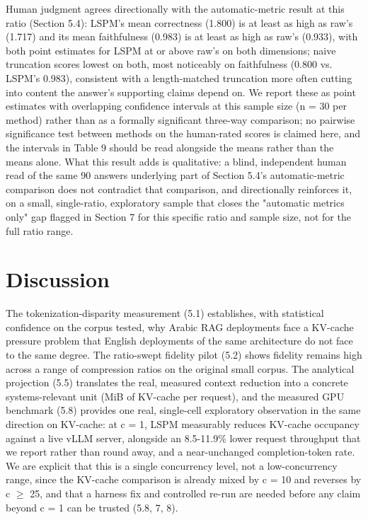 Human judgment agrees directionally with the automatic-metric result at this ratio (Section 5.4): LSPM's mean correctness (1.800) is at least as high as raw's (1.717) and its mean faithfulness (0.983) is at least as high as raw's (0.933), with both point estimates for LSPM at or above raw's on both dimensions; naive truncation scores lowest on both, most noticeably on faithfulness (0.800 vs. LSPM's 0.983), consistent with a length-matched truncation more often cutting into content the answer's supporting claims depend on. We report these as point estimates with overlapping confidence intervals at this sample size (n = 30 per method) rather than as a formally significant three-way comparison; no pairwise significance test between methods on the human-rated scores is claimed here, and the intervals in Table 9 should be read alongside the means rather than the means alone. What this result adds is qualitative: a blind, independent human read of the same 90 answers underlying part of Section 5.4's automatic-metric comparison does not contradict that comparison, and directionally reinforces it, on a small, single-ratio, exploratory sample that closes the "automatic metrics only" gap flagged in Section 7 for this specific ratio and sample size, not for the full ratio range.

\section{Discussion}
The tokenization-disparity measurement (5.1) establishes, with statistical confidence on the corpus tested, why Arabic RAG deployments face a KV-cache pressure problem that English deployments of the same architecture do not face to the same degree. The ratio-swept fidelity pilot (5.2) shows fidelity remains high across a range of compression ratios on the original small corpus. The analytical projection (5.5) translates the real, measured context reduction into a concrete systems-relevant unit (MiB of KV-cache per request), and the measured GPU benchmark (5.8) provides one real, single-cell exploratory observation in the same direction on KV-cache: at c = 1, LSPM measurably reduces KV-cache occupancy against a live vLLM server, alongside an 8.5-11.9\% lower request throughput that we report rather than round away, and a near-unchanged completion-token rate. We are explicit that this is a single concurrency level, not a low-concurrency range, since the KV-cache comparison is already mixed by c = 10 and reverses by c $\geq$ 25, and that a harness fix and controlled re-run are needed before any claim beyond c = 1 can be trusted (5.8, 7, 8).


